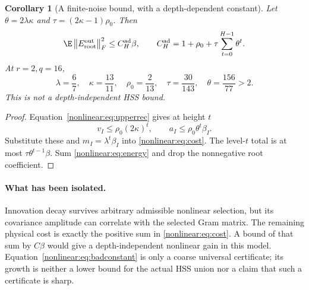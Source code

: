 \documentclass[11pt,oneside,openany,a4paper]{book}
\numberwithin{equation}{chapter}
\newtheorem{corollary}[theorem]{Corollary}
\theoremstyle{definition}
\theoremstyle{remark}
\newcommand{\F}[1]{\left\lVert#1\right\rVert_F}
\begin{document}
\begin{corollary}[A finite-noise bound, with a depth-dependent constant]\label{nonlinear:cor:finiteheight}
Let $\theta=2\lambda\kappa$ and $\tau=(2\kappa-1)\rho_0$. Then
\begin{equation}\label{nonlinear:eq:badconstant}
 \E\F{E_{\rm root}^{\rm out}}^2\le C_H^{\rm ad}\beta,\qquad
 C_H^{\rm ad}=1+\rho_0+\tau\sum_{t=0}^{H-1}\theta^t.
\end{equation}
At $r=2,q=16$,
\[
 \lambda=\frac67,\quad\kappa=\frac{13}{11},\quad\rho_0=\frac2{13},\quad
 \tau=\frac{30}{143},\quad\theta=\frac{156}{77}>2.
\]
This is not a depth-independent HSS bound.
\end{corollary}
\begin{proof}
Equation~\eqref{nonlinear:eq:upperrec} gives at height $t$
\[
 v_I\le\rho_0(2\kappa)^t,\qquad
 a_I\le\rho_0\theta^t\beta_I.
\]
Substitute these and $m_I=\lambda^t\beta_I$ into \eqref{nonlinear:eq:cost}. The level-$t$ total is at most $\tau\theta^{t-1}\beta$. Sum \eqref{nonlinear:eq:energy} and drop the nonnegative root coefficient.
\end{proof}

\paragraph{What has been isolated.}
Innovation decay survives arbitrary admissible nonlinear selection, but its covariance amplitude can correlate with the selected Gram matrix. The remaining physical cost is exactly the positive sum in \eqref{nonlinear:eq:cost}. A bound of that sum by $C\beta$ would give a depth-independent nonlinear gain in this model. Equation~\eqref{nonlinear:eq:badconstant} is only a coarse universal certificate; its growth is neither a lower bound for the actual HSS union nor a claim that such a certificate is sharp.
\end{document}
